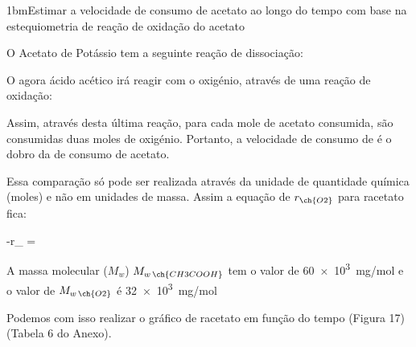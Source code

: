 \documentclass[\mainfilename]{subfiles}
\begin{document}
\begin{sectionBox}1bm{Estimar a velocidade de consumo de acetato ao longo do tempo com base na estequiometria de reação de oxidação do acetato} %
    
    O Acetato de Potássio tem a seguinte reação de dissociação:
    \begin{center}\large
    \end{center}
    O agora ácido acético irá reagir com o oxigénio, através de uma reação de oxidação:
    \begin{center}\large
    \end{center}
    Assim, através desta última reação, para cada mole de acetato consumida, são consumidas duas moles de oxigénio. Portanto, a velocidade de consumo de  é o dobro da de consumo de acetato.\par

    Essa comparação só pode ser realizada através da unidade de quantidade química (moles) e não em unidades de massa. Assim a equação de \(r_{\ch{O2}}\) para racetato fica:
    \begin{BM}
        -r_{}
        = 
        \,
    \end{BM}
    A massa molecular (\(M_w\)) \(M_{w\,\ch{CH3COOH}}\) tem o valor de \qty{60e3}{\milli\gram/\mole} e o valor de \(M_{w\,\ch{O2}}\) é \qty{32e3}{\milli\gram/\mole}\par


    Podemos com isso realizar o gráfico de racetato em função do tempo (Figura 17) (Tabela 6 do Anexo).

    \begin{center}
\end{center}
\end{sectionBox}
\end{document}

